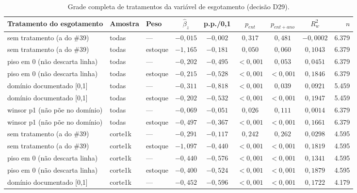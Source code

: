 \begin{table}[!ht]
\centering
\caption[Grade de tratamentos da variável de esgotamento]{Grade completa de tratamentos da variável de esgotamento (decisão D29).}
\label{tab:deplecao}
\scriptsize
\begin{tabular}{p{3.6cm}llcccccr}
\toprule
\textbf{Tratamento do esgotamento} & \textbf{Amostra} & \textbf{Peso} & \textbf{$\hat{\beta}_z$} & \textbf{p.p./0,1} & \textbf{$p_{ent}$} & \textbf{$p_{ent+ano}$} & \textbf{$R^2_w$} & \textbf{$n$} \\
\midrule
sem tratamento (a do \#39) & todas & --- & $-0{,}015$ & $-0{,}002$ & $0{,}317$ & $0{,}481$ & $-0{,}0002$ & 6.379 \\
sem tratamento (a do \#39) & todas & estoque & $-1{,}165$ & $-0{,}181$ & $0{,}050$ & $0{,}060$ & $0{,}1043$ & 6.379 \\
piso em 0 (não descarta linha) & todas & --- & $-0{,}202$ & $-0{,}495$ & $<0{,}001$ & $0{,}053$ & $0{,}0451$ & 6.379 \\
piso em 0 (não descarta linha) & todas & estoque & $-0{,}215$ & $-0{,}528$ & $<0{,}001$ & $<0{,}001$ & $0{,}1846$ & 6.379 \\
domínio documentado [0,1] & todas & --- & $-0{,}311$ & $-0{,}818$ & $<0{,}001$ & $0{,}039$ & $0{,}0921$ & 5.459 \\
domínio documentado [0,1] & todas & estoque & $-0{,}202$ & $-0{,}532$ & $<0{,}001$ & $<0{,}001$ & $0{,}1947$ & 5.459 \\
winsor p1 (não põe no domínio) & todas & --- & $-0{,}069$ & $-0{,}051$ & $0{,}026$ & $0{,}111$ & $0{,}0014$ & 6.379 \\
winsor p1 (não põe no domínio) & todas & estoque & $-0{,}497$ & $-0{,}367$ & $<0{,}001$ & $<0{,}001$ & $0{,}1661$ & 6.379 \\
sem tratamento (a do \#39) & corte1k & --- & $-0{,}291$ & $-0{,}117$ & $0{,}242$ & $0{,}262$ & $0{,}0298$ & 4.595 \\
sem tratamento (a do \#39) & corte1k & estoque & $-1{,}097$ & $-0{,}440$ & $<0{,}001$ & $<0{,}001$ & $0{,}1819$ & 4.595 \\
piso em 0 (não descarta linha) & corte1k & --- & $-0{,}440$ & $-0{,}576$ & $<0{,}001$ & $<0{,}001$ & $0{,}1341$ & 4.595 \\
piso em 0 (não descarta linha) & corte1k & estoque & $-0{,}400$ & $-0{,}524$ & $<0{,}001$ & $<0{,}001$ & $0{,}1879$ & 4.595 \\
domínio documentado [0,1] & corte1k & --- & $-0{,}452$ & $-0{,}596$ & $<0{,}001$ & $<0{,}001$ & $0{,}1722$ & 4.179 \\

\end{tabular}
\end{table}
